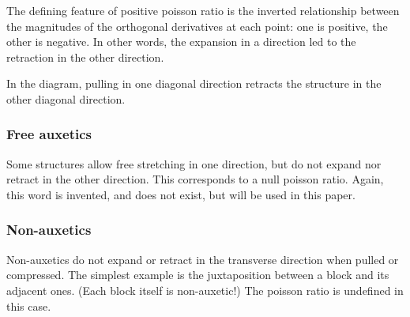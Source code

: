 \documentclass{article}
\begin{document}
The defining feature of positive poisson ratio is the inverted relationship between the magnitudes of the orthogonal derivatives at each point: one is positive, the other is negative. In other words, the expansion in a direction led to the retraction in the other direction.

\vspace{5mm}


\vspace{5mm}

In the diagram, pulling in one diagonal direction retracts the structure in the other diagonal direction.

\subsubsection{Free auxetics}
Some structures allow free stretching in one direction, but do not expand nor retract in the other direction. This corresponds to a null poisson ratio. Again, this word is invented, and does not exist, but will be used in this paper.

\subsubsection{Non-auxetics}
Non-auxetics do not expand or retract in the transverse direction when pulled or compressed. The simplest example is the juxtaposition between a block and its adjacent ones. (Each block itself is non-auxetic!) The poisson ratio is undefined in this case.
\end{document}
